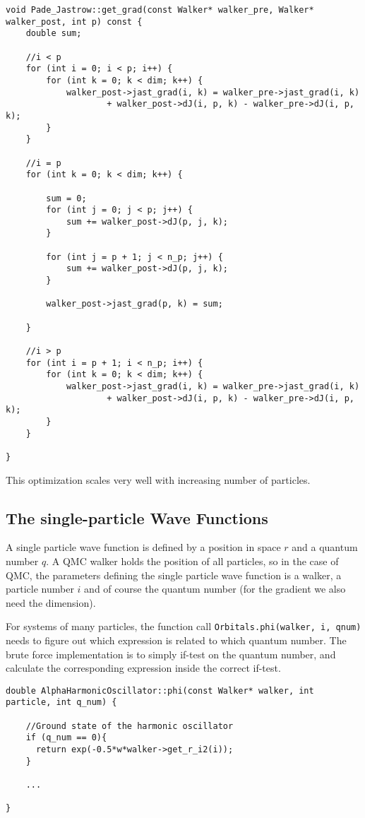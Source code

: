 \begin{lstlisting}
void Pade_Jastrow::get_grad(const Walker* walker_pre, Walker* walker_post, int p) const {
    double sum;

    //i < p
    for (int i = 0; i < p; i++) {
        for (int k = 0; k < dim; k++) {
            walker_post->jast_grad(i, k) = walker_pre->jast_grad(i, k)
                    + walker_post->dJ(i, p, k) - walker_pre->dJ(i, p, k);
        }
    }

    //i = p
    for (int k = 0; k < dim; k++) {

        sum = 0;
        for (int j = 0; j < p; j++) {
            sum += walker_post->dJ(p, j, k);
        }

        for (int j = p + 1; j < n_p; j++) {
            sum += walker_post->dJ(p, j, k);
        }

        walker_post->jast_grad(p, k) = sum;

    }

    //i > p
    for (int i = p + 1; i < n_p; i++) {
        for (int k = 0; k < dim; k++) {
            walker_post->jast_grad(i, k) = walker_pre->jast_grad(i, k) 
                    + walker_post->dJ(i, p, k) - walker_pre->dJ(i, p, k);
        }
    }

}
\end{lstlisting}

This optimization scales very well with increasing number of particles.


\subsection{The single-particle Wave Functions}
\label{sec:optSPWFqnumIndie}

A single particle wave function is defined by a position in space $r$ and a quantum number $q$. A QMC walker holds the position of all particles, so in the case of QMC, the parameters defining the single particle wave function is a walker, a particle number $i$ and of course the quantum number (for the gradient we also need the dimension).

For systems of many particles, the function call \verb+Orbitals.phi(walker, i, qnum)+ needs to figure out which expression is related to which quantum number. The brute force implementation is to simply if-test on the quantum number, and calculate the corresponding expression inside the correct if-test.

\begin{lstlisting}
double AlphaHarmonicOscillator::phi(const Walker* walker, int particle, int q_num) {
    
    //Ground state of the harmonic oscillator
    if (q_num == 0){
      return exp(-0.5*w*walker->get_r_i2(i));
    }
    
    ...
    
}
\end{lstlisting}

